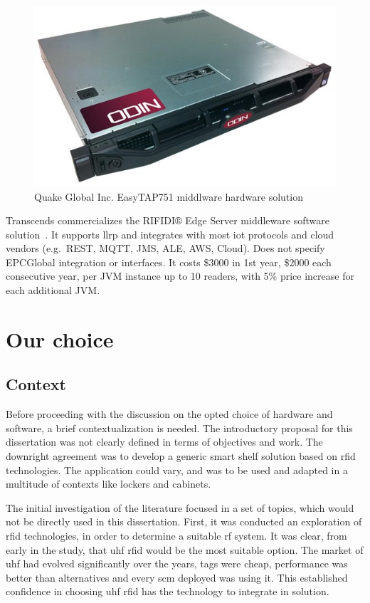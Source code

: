 \begin{figure}[H]
    \centering
    \includegraphics[width=0.6\linewidth]{./figs/02-state-of-the-art/easytap751.jpg}
    \caption[Quake Global Inc. EasyTAP751 middlware hardware solution]{Quake Global Inc. EasyTAP751 middlware hardware solution~\cite{RFIDEasyTAPTag}} 
    \label{fig:easytap751}
\end{figure}

Transcends commercializes the RIFIDI® Edge Server middleware software solution~\cite{RIFIDIEdgeServer2015}. It supports \ac{llrp} and integrates with most \ac{iot} protocols and cloud vendors (e.g.\ REST, MQTT, JMS, ALE, AWS, Cloud). Does not specify EPCGlobal integration or interfaces. It costs \$$3000$ in 1st year, \$$2000$ each consecutive year, per JVM instance up to 10 readers, with 5\% price increase for each additional JVM.

\section{Our choice} \label{sec:ourchoice}

\subsection{Context}

Before proceeding with the discussion on the opted choice of hardware and software, a brief contextualization is needed.
The introductory proposal for this dissertation was not clearly defined in terms of objectives and work. The downright agreement was to develop a generic smart shelf solution based on \ac{rfid} technologies. The application could vary, and was to be used and adapted in a multitude of contexts like lockers and cabinets.

The initial investigation of the literature focused in a set of topics, which would not be directly used in this dissertation.
First, it was conducted an exploration of \ac{rfid} technologies, in order to determine a suitable \ac{rf} system. It was clear, from early in the study, that \ac{uhf} \ac{rfid} would be the most suitable option. The market of \ac{uhf} had evolved significantly over the years, tags were cheap, performance was better than alternatives and every \ac{scm} deployed was using it. This established confidence in choosing \ac{uhf} \ac{rfid} has the technology to integrate in solution.

